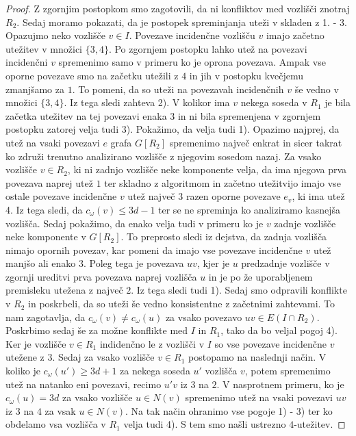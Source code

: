 \documentclass[12pt,a4paper,twoside]{article}
\theoremstyle{definition} %
\theoremstyle{plain} %
\numberwithin{equation}{section}  %
\begin{document}
\begin{proof}
Z zgornjim postopkom smo zagotovili, da ni konfliktov med vozlišči znotraj $R_2$. Sedaj moramo pokazati, da je postopek spreminjanja uteži v skladen z 1. - 3. Opazujmo neko vozlišče $v \in I$. Povezave incidenčne vozlišču $v$ imajo začetno utežitev v množici $\{3,4\}$. Po zgornjem postopku lahko utež na povezavi incidenčni $v$ spremenimo samo v primeru ko je oprona povezava. Ampak vse oporne povezave smo na začetku utežili z $4$ in jih v postopku kvečjemu zmanjšamo za $1$. To pomeni, da so uteži na povezavah incidenčnih $v$ še vedno v množici $\{3,4\}$. Iz tega sledi zahteva 2). V kolikor ima $v$ nekega soseda v $R_1$ je bila začetka utežitev na tej povezavi enaka $3$ in ni bila spremenjena v zgornjem postopku zatorej velja tudi 3). Pokažimo, da velja tudi 1). Opazimo najprej, da utež na vsaki povezavi $e$ grafa $G[R_2]$ spremenimo največ enkrat in sicer takrat ko združi trenutno analizirano vozlišče z njegovim sosedom nazaj. Za vsako vozlišče $v \in R_2$, ki ni zadnjo vozlišče neke komponente velja, da ima njegova prva povezava naprej utež $1$ ter skladno z algoritmom in začetno utežitvijo imajo vse ostale povezave incidenčne $v$ utež največ $3$ razen oporne povezave $e_v$, ki ima utež 4. Iz tega sledi, da $c_{\omega}(v) \le 3d - 1$ ter se ne spreminja ko analiziramo kasnejša vozlišča. Sedaj pokažimo, da enako velja tudi v primeru ko je $v$ zadnje vozlišče neke komponente v $G[R_2]$. To preprosto sledi iz dejstva, da zadnja vozlišča nimajo opornih povezav, kar pomeni da imajo vse povezave incidenčne $v$ utež manjšo ali enako $3$. Poleg tega je povezava $uv$, kjer je $u$ predzadnje vozlišče v zgornji ureditvi prva povezava naprej vozlišča $u$ in je po že uporabljenem premisleku utežena z največ $2$. Iz tega sledi tudi 1).
Sedaj smo odpravili konflikte v $R_2$ in poskrbeli, da so uteži še vedno konsistentne z začetnimi zahtevami. To nam zagotavlja, da $c_{\omega}(v) \neq c_{\omega}(u)$ za vsako povezavo $uv \in E(I \cap R_2)$. Poskrbimo sedaj še za možne konflikte med $I$ in $R_1$, tako da bo veljal pogoj 4). Ker je vozlišče $v \in R_1$ indidenčno le z vozlišči v $I$ so vse povezave incidenčne $v$ utežene z $3$. Sedaj za vsako vozlišče $v \in R_1$ postopamo na naslednji način. V koliko je $c_{\omega}(u') \ge 3d + 1$ za nekega soseda $u'$ vozlišča $v$, potem spremenimo utež na natanko eni povezavi, recimo $u'v$ iz $3$ na $2$. V nasprotnem primeru, ko je $c_{\omega}(u) = 3d$ za vsako vozlišče $u \in N(v)$ spremenimo utež na vsaki povezavi $uv$ iz $3$ na $4$ za vsak $u \in N(v)$.  Na tak način ohranimo vse pogoje 1) - 3) ter ko obdelamo vsa vozlišča v $R_1$ velja tudi 4). S tem smo našli ustrezno $4$-utežitev.
\end{proof}
\end{document}
